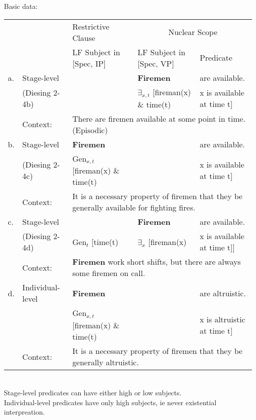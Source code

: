 \documentclass[landscape]{article}
\begin{document}
\begin{example}Basic data:\\
\begin{tabular}{|ll||l|ll|}\hline
&& Restrictive Clause & \multicolumn{2}{c|}{Nuclear Scope} \\
&& LF Subject in [Spec, IP]& LF Subject in [Spec, VP] & Predicate\\\hline\hline
a. &Stage-level && {\bf Firemen}  & are available.\\
&(Diesing 2-4b)&& $\exists_{x,t}$ [fireman(x) \& time(t)  &  x is available at time t] \\
&Context: & \multicolumn{3}{l|}{There are firemen available at some point in time. (Episodic) }\\\hline
b. &Stage-level & {\bf Firemen} &  & are available.\\
&(Diesing 2-4c) & Gen$_{x,t}$ [fireman(x) \& time(t)&& x is available at time t]\\
&Context: & \multicolumn{3}{l|}{It is a necessary property of firemen that they be generally available for fighting fires.}\\\hline
c. &Stage-level & & {\bf Firemen}   & are available.\\
&(Diesing 2-4d) & Gen$_t$ [time(t)& $\exists_x$ [fireman(x) & x is available at time t]]\\
&Context: & \multicolumn{3}{l|}{{\bf Firemen} work short shifts, but there are always some firemen on call.}\\\hline\hline
d. & Individual-level&{\bf Firemen} &  & are altruistic.\\
&&Gen$_{x,t}$ [fireman(x) \& time(t)&& x is altruistic at time t]\\
&Context:& \multicolumn{3}{l|}{It is a necessary property of firemen that they be generally altruistic.}\\\hline
\end{tabular}\\
Stage-level predicates can have either high or low subjects.\\
Individual-level predicates have only high subjects, ie never existential interpreation.
\end{example}
\end{document}
